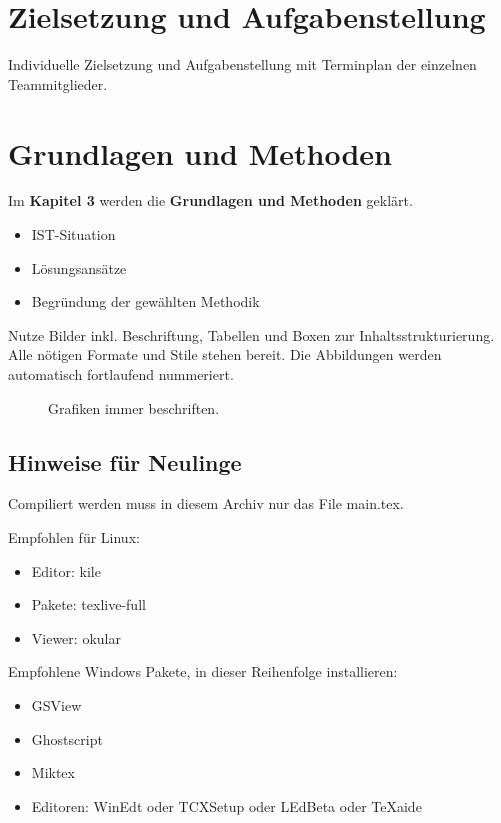 \chapter{Zielsetzung und Aufgabenstellung}

Individuelle Zielsetzung und Aufgabenstellung mit Terminplan der einzelnen Teammitglieder.

\chapter{Grundlagen und Methoden}

Im \textbf{Kapitel 3} werden die \textbf{Grundlagen und Methoden} geklärt.

\begin{itemize}
 \item IST-Situation
 \item Lösungsansätze
 \item Begründung der gewählten Methodik
\end{itemize}

Nutze Bilder inkl. Beschriftung, Tabellen und Boxen zur Inhaltsstrukturierung. Alle nötigen
Formate und Stile stehen bereit. Die Abbildungen werden automatisch fortlaufend
nummeriert.


\begin{figure}[!ht]
 \begin{center}
  \caption{Grafiken immer beschriften.}
  \label{Verweisbezeichnung der Grafik}
 \end{center}
\end{figure}

\section{Hinweise für Neulinge}

Compiliert werden muss in diesem Archiv nur das File main.tex.

Empfohlen für Linux:
\begin{itemize}
 \item Editor: kile
 \item Pakete: texlive-full
 \item Viewer: okular
 \end{itemize}

Empfohlene Windows Pakete, in dieser Reihenfolge installieren:
\begin{itemize}
 \item GSView
 \item Ghostscript
 \item Miktex
 \item Editoren: WinEdt oder TCXSetup oder LEdBeta oder TeXaide
\end{itemize}

